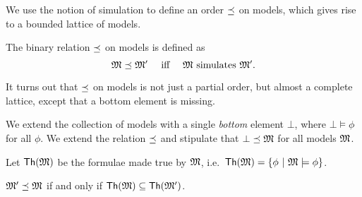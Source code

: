 We use the notion of
simulation to define an order $\preceq$ on models, which gives rise
to a bounded lattice of models.

\begin{definition}
The binary relation $\preceq$ on models is defined as
\[
   \frak{M} \preceq \frak{M}' \quad \text{ iff }\quad \frak{M} \text{ simulates } \frak{M}' .
\]
\end{definition}
It turns out that $\preceq $ on models is not just a partial order, but
almost a complete lattice, except that a bottom element is missing.
\begin{definition}
We extend the collection of models with a single \emph{bottom} element
$\bot$, where $\bot \models \phi$ for all $\phi$. 
We extend the relation $\preceq $  and stipulate that $\bot
\preceq \frak{M}$ for all models $\frak{M}$.
\end{definition}

\begin{definition}
Let $\mathsf{Th}(\frak{M})$ be the formulae made true by $\frak{M}$,
i.e.~$\mathsf{Th}(\frak{M}) = \{\phi\ |\ \frak{M} \models \phi \}$.
\end{definition}

\begin{theorem}\label{theorem:completeLattice}
$\frak{M}' \preceq \frak{M}$ if and only if
$\mathsf{Th}(\frak{M}) \subseteq  \mathsf{Th}(\frak{M}')$.
\end{theorem}

